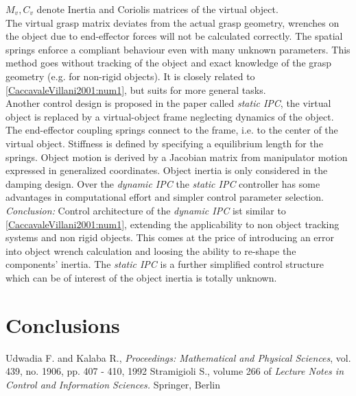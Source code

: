 \documentclass[conference]{IEEEtran}
\begin{document}
$ M_v,C_v $ denote Inertia and Coriolis matrices of the virtual object.\\
The virtual grasp matrix deviates from the actual grasp geometry, wrenches on the object due to end-effector forces will not be calculated correctly. The spatial springs enforce a compliant behaviour even with many unknown parameters. This method goes without tracking of the object and exact knowledge of the grasp geometry (e.g. for non-rigid objects). It is closely related to \ref{CaccavaleVillani2001:num1}, but suits for more general tasks.\\
Another control design is proposed in the paper called \textit{static IPC}, the virtual object is replaced by a virtual-object frame neglecting dynamics of the object. The end-effector coupling springs connect to the frame, i.e. to the center of the virtual object. Stiffness is defined by specifying a equilibrium length for the springs. Object motion is derived by a Jacobian matrix from manipulator motion expressed in generalized coordinates. Object inertia is only considered in the damping design. Over the \textit{dynamic IPC} the \textit{static IPC }controller has some advantages in computational effort and simpler control parameter selection.\\
\textit{Conclusion:} Control architecture of the \textit{dynamic IPC} ist similar to \ref{CaccavaleVillani2001:num1}, extending the applicability to non object tracking systems and non rigid objects. This comes at the price of introducing an error into object wrench calculation and loosing the ability to re-shape the components' inertia. The \textit{static IPC} is a further simplified control structure which can be of interest of the object inertia is totally unknown.



\section{Conclusions}


%


\begin{thebibliography}{1}

Udwadia F. and Kalaba R.,
\newblock  \textit{Proceedings: Mathematical and Physical Sciences}, vol. 439, no. 1906, pp. 407 - 410, 1992
Stramigioli S.,
\newblock volume 266 of \textit{Lecture Notes in Control and Information Sciences.}
\newblock Springer, Berlin



\end{thebibliography}




\end{document}
